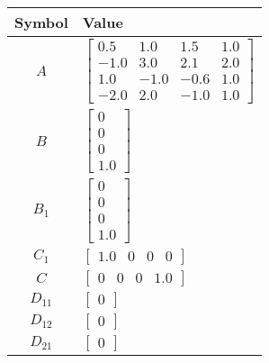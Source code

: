 \begin{tabular}{cl}
\hline
  Symbol  & Value                                                                                                                                    \\
\hline
   $A$    & $\left[\begin{matrix}0.5 & 1.0 & 1.5 & 1.0\\-1.0 & 3.0 & 2.1 & 2.0\\1.0 & -1.0 & -0.6 & 1.0\\-2.0 & 2.0 & -1.0 & 1.0\end{matrix}\right]$ \\
   $B$    & $\left[\begin{matrix}0\\0\\0\\1.0\end{matrix}\right]$                                                                                    \\
 $B_{1}$  & $\left[\begin{matrix}0\\0\\0\\1.0\end{matrix}\right]$                                                                                    \\
 $C_{1}$  & $\left[\begin{matrix}1.0 & 0 & 0 & 0\end{matrix}\right]$                                                                                 \\
   $C$    & $\left[\begin{matrix}0 & 0 & 0 & 1.0\end{matrix}\right]$                                                                                 \\
 $D_{11}$ & $\left[\begin{matrix}0\end{matrix}\right]$                                                                                               \\
 $D_{12}$ & $\left[\begin{matrix}0\end{matrix}\right]$                                                                                               \\
 $D_{21}$ & $\left[\begin{matrix}0\end{matrix}\right]$                                                                                               \\
\hline
\end{tabular}